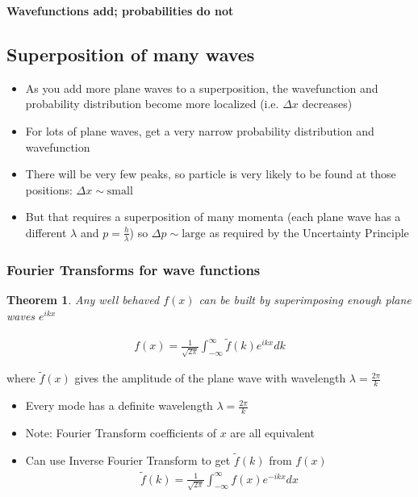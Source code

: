 \documentclass[a4paper,12pt]{article}
\newtheorem{thm}{Theorem}
\begin{document}
\textbf{Wavefunctions add; probabilities do not}

\subsection{Superposition of many waves}
\begin{itemize}
  \item As you add more plane waves to a superposition, the wavefunction and probability distribution become more localized (i.e. $\Delta x$ decreases)
  \item For lots of plane waves, get a very narrow probability distribution and wavefunction
  \item There will be very few peaks, so particle is very likely to be found at those positions: $\Delta x \sim \text{small}$
  \item But that requires a superposition of many momenta (each plane wave has a different $\lambda$ and $p = \frac{h}{\lambda}$) so $\Delta p \sim \text{large}$ as required by the Uncertainty Principle

\end{itemize}

\subsubsection{Fourier Transforms for wave functions}
\begin{thm}
  Any well behaved $f(x)$ can be built by superimposing enough plane waves $e^{ikx}$

  \begin{align}
    f(x) = \frac{1}{\sqrt{2\pi}} \int^{\infty}_{-\infty}\widetilde{f}(k) e^{ikx} dk
  \end{align}
\end{thm}
where $\widetilde{f}(x)$ gives the amplitude of the plane wave with wavelength $\lambda = \frac{2\pi}{k}$

\begin{itemize}
  \item Every mode has a definite wavelength $\lambda = \frac{2\pi}{k}$
  \item Note: Fourier Transform coefficients of $x$ are all equivalent
  \item Can use Inverse Fourier Transform to get $\widetilde{f}(k)$ from $f(x)$
  \begin{align}
    \widetilde{f}(k) = \frac{1}{\sqrt{2\pi}} \int^{\infty}_{-\infty}f(x) e^{-ikx} dx
  \end{align}
\end{itemize}
\end{document}
